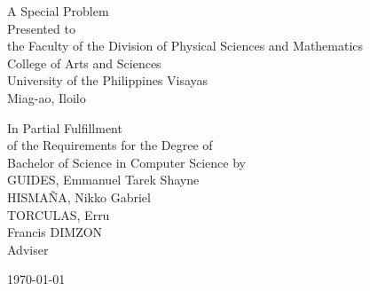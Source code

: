 
\begin{titlepage}
\centering


\vspace{1.75cm}
A Special Problem\\
Presented to\\
the Faculty of the Division of Physical Sciences and Mathematics\\
College of Arts and Sciences\\
University of the Philippines Visayas\\
Miag-ao, Iloilo

\vspace{1.75cm}
In Partial Fulfillment\\
of the Requirements for the Degree of\\
Bachelor of Science in Computer Science
\vspace{1.75cm}
by\\

\vspace{1cm}
GUIDES, Emmanuel Tarek Shayne\\
HISMAÑA, Nikko Gabriel \\
TORCULAS, Erru  \\

\vspace{1.75cm}
Francis DIMZON \\
Adviser\\

\vspace{1.75cm}

\today

\end{titlepage}
